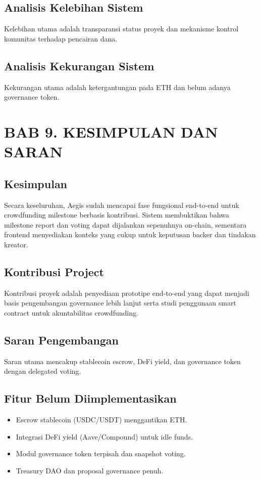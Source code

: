 \documentclass[12pt]{article}
\begin{document}
\subsection{Analisis Kelebihan Sistem}
Kelebihan utama adalah transparansi status proyek dan mekanisme kontrol komunitas terhadap pencairan dana.

\subsection{Analisis Kekurangan Sistem}
Kekurangan utama adalah ketergantungan pada ETH dan belum adanya governance token.

\section{BAB 9. KESIMPULAN DAN SARAN}
\subsection{Kesimpulan}
Secara keseluruhan, Aegis sudah mencapai fase fungsional end-to-end untuk crowdfunding milestone berbasis kontribusi. Sistem membuktikan bahwa milestone report dan voting dapat dijalankan sepenuhnya on-chain, sementara frontend menyediakan konteks yang cukup untuk keputusan backer dan tindakan kreator.

\subsection{Kontribusi Project}
Kontribusi proyek adalah penyediaan prototipe end-to-end yang dapat menjadi basis pengembangan governance lebih lanjut serta studi penggunaan smart contract untuk akuntabilitas crowdfunding.

\subsection{Saran Pengembangan}
Saran utama mencakup stablecoin escrow, DeFi yield, dan governance token dengan delegated voting.

\subsection{Fitur Belum Diimplementasikan}
\begin{itemize}[leftmargin=1.2em]
  \item Escrow stablecoin (USDC/USDT) menggantikan ETH.
  \item Integrasi DeFi yield (Aave/Compound) untuk idle funds.
  \item Modul governance token terpisah dan snapshot voting.
  \item Treasury DAO dan proposal governance penuh.
\end{itemize}
\end{document}
